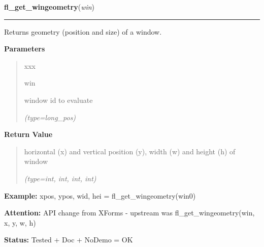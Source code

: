 \hspace{.8\funcindent}\begin{boxedminipage}{\funcwidth}

    \raggedright \textbf{fl\_get\_wingeometry}(\textit{win})

    \vspace{-1.5ex}

    \rule{\textwidth}{0.5\fboxrule}
\setlength{\parskip}{2ex}
    Returns geometry (position and size) of a window.

\setlength{\parskip}{1ex}
      \textbf{Parameters}
      \vspace{-1ex}

      \begin{quote}
        \begin{Ventry}{xxx}

          \item[win]

          window id to evaluate

            {\it (type=long\_pos)}

        \end{Ventry}

      \end{quote}

      \textbf{Return Value}
    \vspace{-1ex}

      \begin{quote}
      horizontal (x) and vertical position (y), width (w) and height (h) of
      window

      {\it (type=int, int, int, int)}

      \end{quote}

\textbf{Example:} xpos, ypos, wid, hei = fl\_get\_wingeometry(win0)



\textbf{Attention:} API change from XForms - upstream was fl\_get\_wingeometry(win, x, y, w, h)



\textbf{Status:} Tested + Doc + NoDemo = OK



    \end{boxedminipage}

    \label{xformslib:flxbasic:fl_get_display}

    \vspace{0.5ex}

